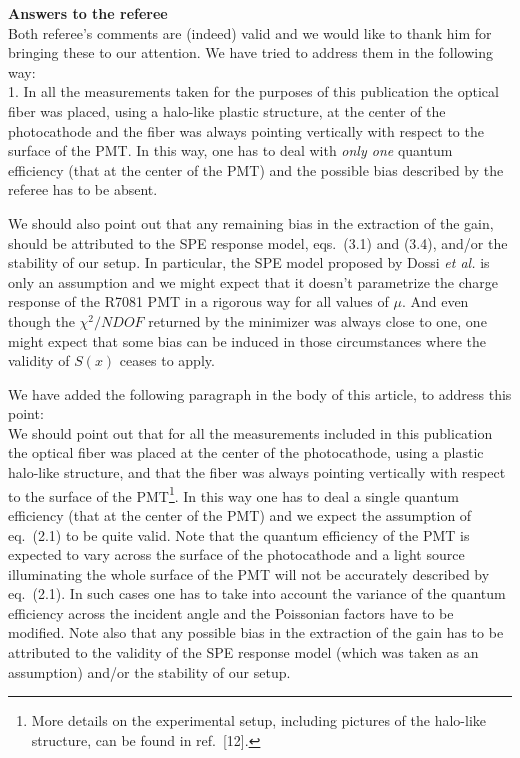\documentclass[a4paper,11pt]{article}
\begin{document}
{\bf Answers to the referee}
\\[1ex]

Both referee's comments are (indeed) valid and we would like to thank him for bringing these to our attention. 
We have tried to address them in the following way: 
\\[1ex]

1. In all the measurements taken for the purposes of this publication the optical fiber was placed, using a halo-like plastic structure, 
at the center of the photocathode and the fiber was always pointing vertically with respect to the surface of the PMT.   
In this way, one has to deal with \emph{only one} quantum efficiency (that at the center of the PMT) and the possible bias 
described by the referee has to be absent. 

We should also point out that any remaining bias in the extraction of the gain, should be attributed to the SPE response model, 
eqs.~(3.1) and (3.4), and/or the stability of our setup. In particular, the SPE model proposed by Dossi \emph{et al.} is only an assumption 
and we might expect that it doesn't parametrize the charge response of the R7081 PMT in a rigorous way for all values of $\mu$. 
And even though the $\chi^2/NDOF$ returned by the minimizer was always close to one, 
one might expect that some bias can be induced in those circumstances where the validity of $S(x)$ ceases to apply. 

We have added the following paragraph in the body of this article, to address this point:
\\[1ex]

We should point out that for all the measurements included in this publication the optical fiber was placed at the center of the photocathode,
using a plastic halo-like structure, and that the fiber was always pointing vertically with respect to the surface of the PMT\footnote{%
More details on the experimental setup, including pictures of the halo-like structure, can be found in ref.~[12].}. 
In this way one has to deal a single quantum efficiency (that at the center of the PMT) and we expect the assumption of eq.~(2.1) to be quite valid. 
Note that the quantum efficiency of the PMT is expected to vary across the surface of the photocathode and a light source illuminating the whole surface of the PMT will not be 
accurately described by eq.~(2.1). In such cases one has to take into account the variance of the quantum efficiency across the incident angle and the Poissonian factors have to be modified. 
Note also that any possible bias in the extraction of the gain has to be attributed to the validity of the SPE response model (which was taken as an assumption)
and/or the stability of our setup. 
\end{document}
